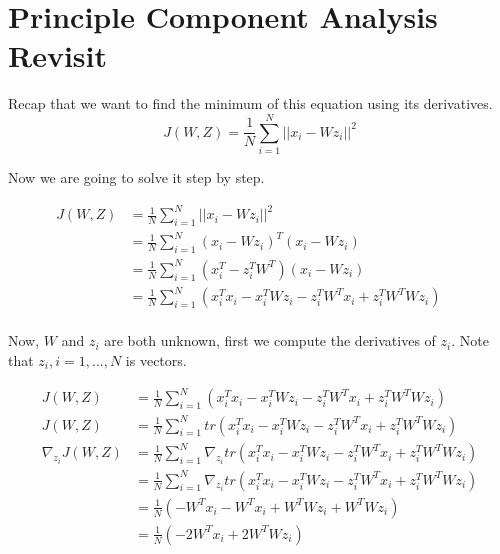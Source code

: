 \documentclass[a4paper]{book}
\begin{document}
  \section{Principle Component Analysis Revisit}

  Recap that we want to find the minimum of this equation using its
  derivatives.
  \begin{displaymath}
    J(W, Z) = \frac{1}{N} \sum\limits^{N}_{i=1}||x_{i} -
    Wz_{i}||^{2}
  \end{displaymath}

  Now we are going to solve it step by step.

  \begin{align*}
    J(W, Z) & = \frac{1}{N} \sum\limits^{N}_{i=1}||x_{i} - Wz_{i}||^{2}
      && \\
            & = \frac{1}{N} \sum\limits^{N}_{i=1}(x_{i} - Wz_{i})^{T}(x_{i} - Wz_{i})
      && \\
            & = \frac{1}{N} \sum\limits^{N}_{i=1}(x_{i}^{T} -
              z_{i}^{T}W^{T})(x_{i} - Wz_{i})
      && \\
            & = \frac{1}{N} \sum\limits^{N}_{i=1}(x_{i}^{T}x_{i} -
            x_{i}^{T}Wz_{i} - z_{i}^{T}W^{T}x_{i} +
            z_{i}^{T}W^{T}Wz_{i})
      && \\
  \end{align*}

  Now, $W$ and $z_{i}$ are both unknown, first we compute the
  derivatives of $z_{i}$. Note that $z_{i}, i = 1, ..., N$ is vectors.

  \begin{align*}
    J(W, Z) & = \frac{1}{N} \sum\limits^{N}_{i=1}(x_{i}^{T}x_{i} -
            x_{i}^{T}Wz_{i} - z_{i}^{T}W^{T}x_{i} +
            z_{i}^{T}W^{T}Wz_{i}) \\
    J(W, Z) & = \frac{1}{N} \sum\limits^{N}_{i=1}tr(x_{i}^{T}x_{i} -
            x_{i}^{T}Wz_{i} - z_{i}^{T}W^{T}x_{i} +
            z_{i}^{T}W^{T}Wz_{i}) \\
      \nabla_{z_{i}}J(W, Z) & = \frac{1}{N} \sum\limits^{N}_{i=1}\nabla_{z_{i}}tr(x_{i}^{T}x_{i} -
            x_{i}^{T}Wz_{i} - z_{i}^{T}W^{T}x_{i} +
            z_{i}^{T}W^{T}Wz_{i}) \\
                            & = \frac{1}{N} \sum\limits^{N}_{i=1}\nabla_{z_{i}}tr(x_{i}^{T}x_{i} -
            x_{i}^{T}Wz_{i} - z_{i}^{T}W^{T}x_{i} +
            z_{i}^{T}W^{T}Wz_{i}) \\
                            & = \frac{1}{N} (-W^{T}x_{i} - W^{T}x_{i} +
                            W^{T}Wz_{i} + W^{T}Wz_{i}) \\
                            & = \frac{1}{N} (-2W^{T}x_{i} + 2W^{T}Wz_{i}) \\
  \end{align*}
\end{document}

